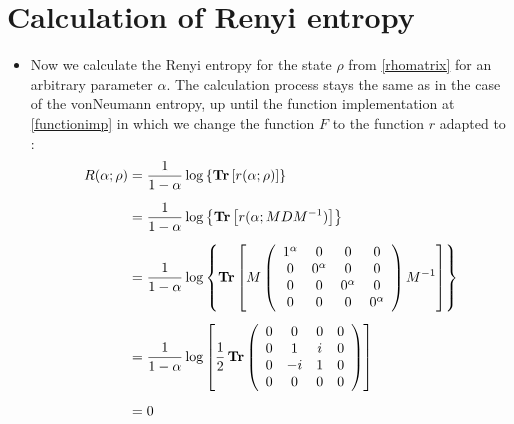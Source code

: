\section{Calculation of Renyi entropy}
\begin{itemize}
\item
Now we calculate the Renyi entropy for the state $\rho$ from \eqref{rhomatrix} for an arbitrary parameter $\alpha$. The calculation process stays the same as in the case of the vonNeumann entropy, up until the function implementation at \eqref{functionimp} in which we change the function $F$ to the function $r$ adapted to :
\begin{align}
\label{functionimp1}
R(\alpha;\rho) &= \frac{1}{1-\alpha}\log \left\{ \operatorname{\textup{\textbf{Tr}}} \left[ r(\alpha;\rho) \right] \right\} \\[0.5em]
&= \frac{1}{1-\alpha}\log \left\{ \operatorname{\textup{\textbf{Tr}}} \left[ r(\alpha;MDM^{-1}) \right] \right\} \\[0.5em]
&=\frac{1}{1-\alpha} \log \left\{ \operatorname{\textup{\textbf{Tr}}} \left[
M
\left( \begin{array}{cccc}
 1^{\alpha} & 0 & 0 & 0 \\
 0 & 0^{\alpha} & 0 & 0 \\
 0 & 0 & 0^{\alpha} & 0 \\
 0 & 0 & 0 & 0^{\alpha} \\
\end{array}
\right)
M^{-1}
\right]
\right\}
\nonumber\\[0.5em]
&=\frac{1}{1-\alpha} \log \left[ \frac{1}{2}\operatorname{\textup{\textbf{Tr}}} \left(
\begin{array}{cccc}
 0 & 0 & 0 & 0 \\
 0 & 1 & i & 0 \\
 0 & -i & 1 & 0 \\
 0 & 0 & 0 & 0 \\
\end{array}
\right)
\right] \\[0.5em]
&=0
\end{align}


\end{itemize}
